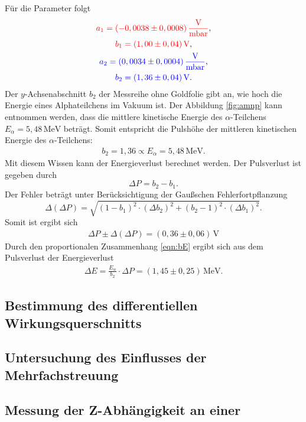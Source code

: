 Für die Parameter folgt
\begin{gather*}
  \textcolor{red}{a_1 = (-0,0038 \pm 0,0008)\,\frac{\text{V}}{\text{mbar}}}, \\
  \textcolor{red}{b_1 = (1,00 \pm 0,04)\,\text{V}}, \\
  \textcolor{blue}{a_2 = (0,0034 \pm 0,0004)\,\frac{\text{V}}{\text{mbar}}}, \\
  \textcolor{blue}{b_2 = (1,36 \pm 0,04)\,\text{V}}.
\end{gather*}
Der $y$-Achsenabschnitt $b_2$ der Messreihe ohne Goldfolie gibt an,
wie hoch die Energie eines Alphateilchens im Vakuum ist.
Der Abbildung \ref{fig:amnp} kann entnommen werden,
dass die mittlere kinetische Energie des $\alpha$-Teilchens $E_{\alpha} = 5,48\,\text{MeV}$ beträgt.
Somit entspricht die Pulshöhe der mittleren kinetischen Energie des $\alpha$-Teilchens:
\begin{align}
  b_2 = 1,36 \propto E_{\alpha} = 5,48\,\text{MeV}.
  \label{eqn:bE}
\end{align}
Mit diesem Wissen kann der Energieverlust berechnet werden.
Der Pulsverlust ist gegeben durch
\begin{equation}
  \Delta{P} = b_2-b_1.
\end{equation}
Der Fehler beträgt unter Berücksichtigung der Gaußschen Fehlerfortpflanzung
\begin{equation}
  \Delta(\Delta{P}) = \sqrt{(1-b_1)^2\cdot(\Delta{b_2})^2 + (b_2-1)^2\cdot(\Delta{b_1})^2}.
\end{equation}
Somit ist ergibt sich
\begin{align*}
  \Delta{P}\pm\Delta(\Delta{P}) = (0,36\pm0,06)\,\text{V}
\end{align*}
Durch den proportionalen Zusammenhang \eqref{eqn:bE} ergibt sich aus dem Pulsverlust der Energieverlust
\begin{align*}
  \Delta{E} = \frac{E_{\alpha}}{b_2}\cdot{\Delta{P}} = (1,45\pm0,25)\,\text{MeV}.
\end{align*}

\subsection{Bestimmung des differentiellen Wirkungsquerschnitts}

\subsection{Untersuchung des Einflusses der Mehrfachstreuung}

\subsection{Messung der Z-Abhängigkeit an einer }
